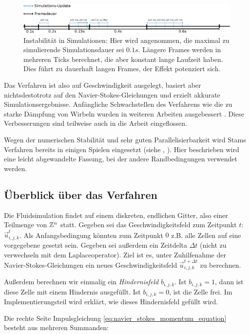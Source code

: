 \begin{figure}[ht]
\includegraphics[width=12cm]{images/simulation_blowup}
\caption{Instabilität in Simulationen: Hier wird angenommen, die maximal zu simulierende Simulationsdauer sei $0.1s$. Längere Frames werden in mehreren Ticks berechnet, die aber konstant lange Laufzeit haben. Dies führt zu dauerhaft langen Frames, der Effekt potenziert sich.}
\end{figure}

Das Verfahren ist also auf Geschwindigkeit ausgelegt, basiert aber
nichtsdestotrotz auf den Navier-Stokes-Gleichungen und erzielt akkurate
Simulationsergebnisse. Anfängliche Schwachstellen des Verfahrens wie die zu
starke Dämpfung von Wirbeln wurden in weiteren Arbeiten ausgebessert
\cite{Foster}. Diese Verbesserungen sind teilweise auch in die Arbeit
eingeflossen.

Wegen der numerischen Stabilität und sehr guten Parallelisierbarkeit wird Stams
Verfahren bereits in einigen Spielen eingesetzt (siehe \cite{Crane2007},
\cite{Peschel2009}). Hier beschrieben wird eine leicht abgewandelte
Fassung, bei der andere Randbedingungen verwendet werden.

\subsection{Überblick über das Verfahren}

Die Fluidsimulation findet auf einem diskreten, endlichen Gitter, also einer
Teilmenge von $\mathbb{Z}^n$ statt. Gegeben sei das Geschwindigkeitsfeld zum
Zeitpunkt $t$: $\vec{u}_{i,j,k}^t$. Als Anfangsbedingung könnten zum Zeitpunkt $0$
z.B. alle Zellen auf eine vorgegebene  gesetzt sein.
Gegeben sei außerdem ein Zeitdelta $\Delta t$ (nicht zu verwechseln mit dem
Laplaceoperator). Ziel ist es, unter Zuhilfenahme der
Navier-Stokes-Gleichungen ein neues Geschwindigkeitsfeld $\vec{u}_{i,j,k}^{t+\Delta
t}$ zu berechnen.

Außerdem berechnen wir einmalig ein \emph{Hindernisfeld} $b_{i,j,k}$. Ist $b_{i,j,k}
= 1$, dann ist diese Zelle mit einem Hindernis ausgefüllt. Ist $b_{i,j,k} = 0$,
ist die Zelle frei. Im Implementierungsteil wird erklärt, wie dieses
Hindernisfeld gefüllt wird.

Die rechte Seite Impulsgleichung \eqref{eq:navier_stokes_momentum_equation} besteht
aus mehreren Summanden:

